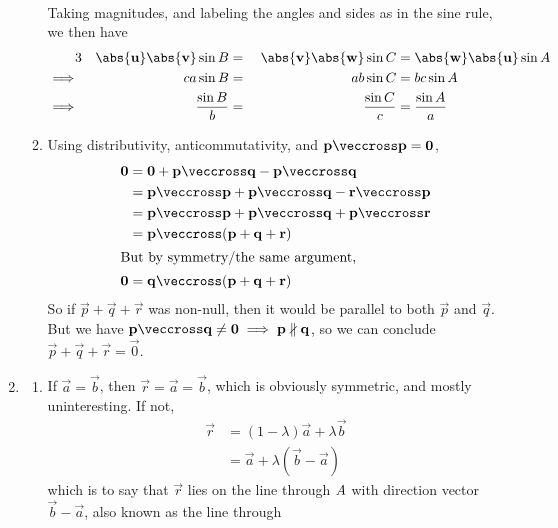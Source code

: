 \documentclass[fleqn,a4paper,11pt]{article}
\begin{document}
\begin{enumerate}
\begin{enumerate}
\begin{align*}
      \end{align*}
      Taking magnitudes, and labeling the angles and sides as in the sine rule,
      we then have
      \begin{alignat*}3
       && \abs{\vec u}\abs{\vec v}\sin B &={}&
          \abs{\vec v}\abs{\vec w}\sin C &=
          \abs{\vec w}\abs{\vec u}\sin A \\
       \implies{}&&
          ca\sin B &={}&
          ab\sin C &=
          bc\sin A \\
       \implies{}&&
          \frac{\sin B}b &={}&
          \frac{\sin C}c &=
          \frac{\sin A}a
      \end{alignat*}
     \item
      Using distributivity, anticommutativity, and
      \(\vec p \veccross \vec p = \vec 0\),
      \begin{align*}
       \vec 0 &= \vec 0 + \vec p \veccross \vec q - \vec p \veccross \vec q \\
              &= \vec p \veccross \vec p + \vec p \veccross \vec q
                 - \vec r \veccross \vec p \\
              &= \vec p \veccross \vec p + \vec p \veccross \vec q
                 + \vec p \veccross \vec r \\
              &= \vec p \veccross (\vec p + \vec q + \vec r) \\
       \intertext{But by symmetry/the same argument,}
       \vec 0 &= \vec q \veccross (\vec p + \vec q + \vec r)
      \end{align*}
      So if \(\vec p + \vec q + \vec r\) was non-null, then it would be parallel
      to both \(\vec p\) and \(\vec q\). But we have
      \(\vec p \veccross \vec q \ne \vec 0 \implies
        \vec p \nparallel \vec q\), so we can conclude
      \(\vec p + \vec q + \vec r = \vec 0\).
    \end{enumerate}
   \item
    \begin{enumerate}
     \item
      If \(\vec a = \vec b\), then \(\vec r = \vec a = \vec b\), which is
      obviously symmetric, and mostly uninteresting. If not,
      \begin{align*}
       \vec r &= (1 - \lambda)\vec a + \lambda \vec b \\
              &= \vec a + \lambda(\vec b - \vec a)
      \end{align*}
      which is to say that \(\vec r\) lies on the line through \(\mathit{A}\) with
      direction vector \(\vec b - \vec a\), also known as the line through

\end{enumerate}
\end{enumerate}
\end{document}
